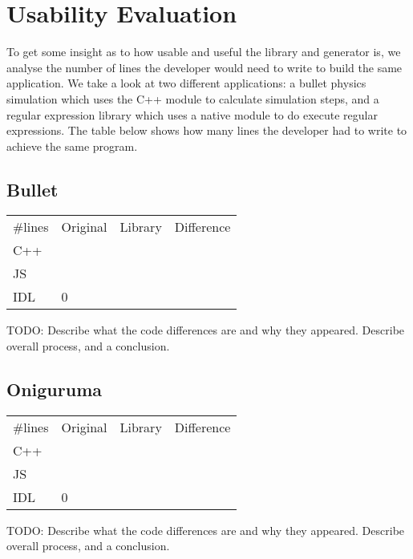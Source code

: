 \section{Usability Evaluation} %
\label{sec:usability_evaluation}
To get some insight as to how usable and useful the library and generator is, we analyse the number of lines the developer would need to write to build the same application. We take a look at two different applications: a bullet physics simulation which uses the C++ module to calculate simulation steps, and a regular expression library which uses a native module to do execute regular expressions. The table below shows how many lines the developer had to write to achieve the same program.


\subsection{Bullet} %
\label{sub:evaluation_usability_bullet}
\begin{table}[h]
\begin{tabular}{llll}
\#lines                  & Original & Library & Difference \\ \cline{2-4} 
\multicolumn{1}{l|}{C++} &          &         &            \\
\multicolumn{1}{l|}{JS}  &          &         &            \\
\multicolumn{1}{l|}{IDL} & 0        &         &           
\end{tabular}
\end{table}

TODO: Describe what the code differences are and why they appeared. Describe overall process, and a conclusion.

\subsection{Oniguruma} %
\label{sub:evaluation_usability_oniguruma}
\begin{table}[h]
\begin{tabular}{llll}
\#lines                  & Original & Library & Difference \\ \cline{2-4} 
\multicolumn{1}{l|}{C++} &          &         &            \\
\multicolumn{1}{l|}{JS}  &          &         &            \\
\multicolumn{1}{l|}{IDL} & 0        &         &           
\end{tabular}
\end{table}

TODO: Describe what the code differences are and why they appeared. Describe overall process, and a conclusion.

